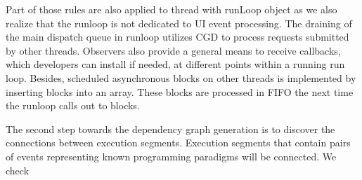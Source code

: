 Part of those rules are also applied to thread with runLoop object as we also realize that the runloop is not dedicated to UI event processing.
The draining of the main dispatch queue in runloop utilizes CGD to process requests submitted by other threads.
Observers also provide a general means to receive callbacks, which developers can install if needed, at different points within a running run loop.
Besides, scheduled asynchronous blocks on other threads is implemented by inserting blocks into an array.
These blocks are processed in FIFO the next time the runloop calls out to blocks.
\par
The second step towards the dependency graph generation is to discover the connections between execution segments.
Execution segments that contain pairs of events representing known programming paradigms will be connected.
We check
